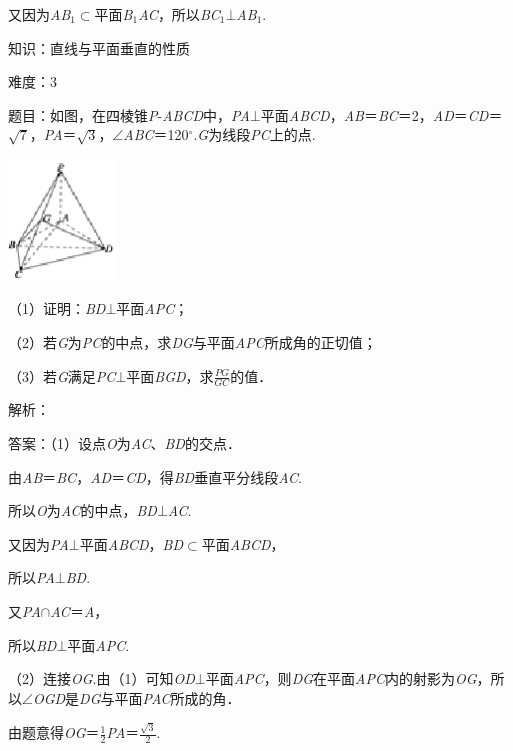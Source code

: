 \documentclass{article} %
\begin{document}
又因为\textit{AB}${}_{1}$$\mathrm{\subset }$平面\textit{B}${}_{1}$\textit{AC}，所以\textit{BC}${}_{1}$$\mathrm{\bot}$\textit{AB}${}_{1}$.

知识：直线与平面垂直的性质

难度：3

题目：如图，在四棱锥\textit{P}-\textit{ABCD}中，\textit{PA}$\mathrm{\bot}$平面\textit{ABCD}，\textit{AB}＝\textit{BC}＝2，\textit{AD}＝\textit{CD}＝$\sqrt{7}$，\textit{PA}＝$\sqrt{3}$，$\mathrm{\angle}$\textit{ABC}＝120$\mathrm{{}^\circ}$.\textit{G}为线段\textit{PC}上的点.

\includegraphics*[width=1.12in, height=1.27in, keepaspectratio=false]{image247}

（1）证明：\textit{BD}$\mathrm{\bot}$平面\textit{APC}；

（2）若\textit{G}为\textit{PC}的中点，求\textit{DG}与平面\textit{APC}所成角的正切值；

（3）若\textit{G}满足\textit{PC}$\mathrm{\bot}$平面\textit{BGD}，求$\frac{PG}{GC}$的值．

解析：

答案：（1）设点\textit{O}为\textit{AC}、\textit{BD}的交点．

由\textit{AB}＝\textit{BC}，\textit{AD}＝\textit{CD}，得\textit{BD}垂直平分线段\textit{AC}.

所以\textit{O}为\textit{AC}的中点，\textit{BD}$\mathrm{\bot}$\textit{AC}.

又因为\textit{PA}$\mathrm{\bot}$平面\textit{ABCD}，\textit{BD}$\mathrm{\subset }$平面\textit{ABCD}，

所以\textit{PA}$\mathrm{\bot}$\textit{BD}.

又\textit{PA}$\mathrm{\cap}$\textit{AC}＝\textit{A}，

所以\textit{BD}$\mathrm{\bot}$平面\textit{APC}.

（2）连接\textit{OG}.由（1）可知\textit{OD}$\mathrm{\bot}$平面\textit{APC}，则\textit{DG}在平面\textit{APC}内的射影为\textit{OG}，所以$\mathrm{\angle}$\textit{OGD}是\textit{DG}与平面\textit{PAC}所成的角．

由题意得\textit{OG}＝$\frac{1}{2}$\textit{PA}＝$\frac{\sqrt{3}}{2}$.
\end{document}
